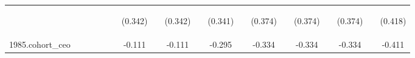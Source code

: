 \begin{center}
\begin{tabular}{lcccccccccccccccccc}
\vspace{4pt} & \begin{footnotesize}\end{footnotesize} & \begin{footnotesize}\end{footnotesize} & \begin{footnotesize}\end{footnotesize} & \begin{footnotesize}\end{footnotesize} & \begin{footnotesize}\end{footnotesize} & \begin{footnotesize}(0.342)\end{footnotesize} & \begin{footnotesize}\end{footnotesize} & \begin{footnotesize}(0.342)\end{footnotesize} & \begin{footnotesize}\end{footnotesize} & \begin{footnotesize}(0.341)\end{footnotesize} & \begin{footnotesize}\end{footnotesize} & \begin{footnotesize}(0.374)\end{footnotesize} & \begin{footnotesize}\end{footnotesize} & \begin{footnotesize}(0.374)\end{footnotesize} & \begin{footnotesize}\end{footnotesize} & \begin{footnotesize}(0.374)\end{footnotesize} & \begin{footnotesize}\end{footnotesize} & \begin{footnotesize}(0.418)\end{footnotesize} \\
1985.cohort\_ceo &  &  &  &  &  & -0.111 &  & -0.111 &  & -0.295 &  & -0.334 &  & -0.334 &  & -0.334 &  & -0.411 \\

\end{tabular}
\end{center}
